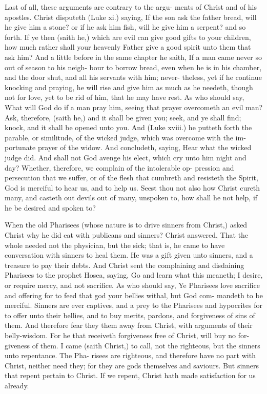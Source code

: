 \documentclass{custom}
\begin{document}
Last of all, these arguments are contrary to the argu- 
ments of Christ and of his apostles. Christ disputeth 
(Luke xi.) saying, If the son ask the father bread, will he 
give him a stone? or if he ask him fish, will he give him a 
serpent? and so forth. If ye then (saith he,) which are 
evil can give good gifts to your children, how much rather 
shall your heavenly Father give a good spirit unto them 
that ask him? And a little before in the same chapter he 
saith, If a man came never so out of season to his neigh- 
bour to borrow bread, even when he is in his chamber, 
and the door shut, and all his servants with him; never- 
theless, yet if he continue knocking and praying, he will 
rise and give him as much as he needeth, though not for 
love, yet to be rid of him, that he may have rest. As who 
should say, What will God do if a man pray him, seeing 
that prayer overcometh an evil man? Ask, therefore, 
(saith he,) and it shall be given you; seek, and ye shall 
find; knock, and it shall be opened unto you. And 
(Luke xviii.) he putteth forth the parable, or similitude, 
of the wicked judge, which was overcome with the im- 
portunate prayer of the widow. And concludeth, saying, 
Hear what the wicked judge did. And shall not God 
avenge his elect, which cry unto him night and day? 
Whether, therefore, we complain of the intolerable op- 
pression and persecution that we suffer, or of the flesh that 
cumbreth and resisteth the Spirit, God is merciful to hear 
us, and to help us. Seest thou not also how Christ cureth 
many, and casteth out devils out of many, unspoken to, 
how shall he not help, if he be desired and spoken to? 

When the old Pharisees (whose nature is to drive 
sinners from Christ,) asked Christ why he did eat with 
publicans and sinners? Christ answered, That the whole 
needed not the physician, but the sick; that is, he came to 
have conversation with sinners to heal them. He was a 
gift given unto sinners, and a treasure to pay their debts. 
And Christ sent the complaining and disdaining Pharisees 
to the prophet Hosea, saying, Go and learn what this 
meaneth; I desire, or require mercy, and not sacrifice. As 
who should say, Ye Pharisees love sacrifice and offering 
for to feed that god your bellies withal, but God com- 
mandeth to be merciful. Sinners are ever captives, and 
a prey to the Pharisees and hypocrites for to offer unto 
their bellies, and to buy merits, pardons, and forgiveness 
of sins of them. And therefore fear they them away from 
Christ, with arguments of their belly-wisdom. For he 
that receiveth forgiveness free of Christ, will buy no for- 
giveness of them. I came (saith Christ,) to call, not the 
righteous, but the sinners unto repentance. The Pha- 
risees are righteous, and therefore have no part with Christ, 
neither need they; for they are gods themselves and 
saviours. But sinners that repent pertain to Christ. 
If we repent, Christ hath made satisfaction for us 
already. 
\end{document}
